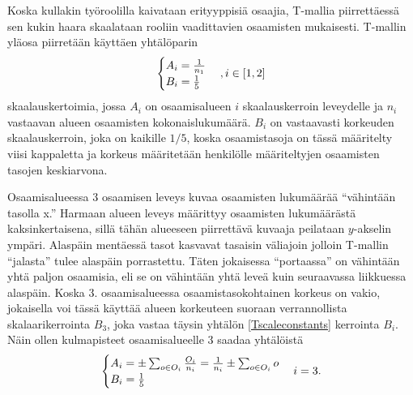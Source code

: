 \documentclass[a4paper,finnish,12pt]{article}
\begin{document}
Koska kullakin työroolilla kaivataan erityyppisiä osaajia, T-mallia piirrettäessä sen kukin haara skaalataan rooliin vaadittavien osaamisten mukaisesti. T-mallin yläosa piirretään käyttäen yhtälöparin %
\begin{equation}
\begin{cases}
A_i = \frac{1}{n_1} \\
B_i = \frac{1}{5} \\
\end{cases} \\ , i \in [1,2]
\label{Tscaleconstants}
\end{equation} skaalauskertoimia, jossa $A_i$ on osaamisalueen $i$ skaalauskerroin leveydelle ja $n_i$ vastaavan alueen osaamisten kokonaislukumäärä. $B_i$ on vastaavasti korkeuden skaalauskerroin, joka on kaikille $1/5$, koska osaamistasoja on tässä määritelty viisi kappaletta ja korkeus määritetään henkilölle määriteltyjen osaamisten tasojen keskiarvona.

Osaamisalueessa 3 osaamisen leveys kuvaa osaamisten lukumäärää ``vähintään tasolla x.'' Harmaan alueen leveys määrittyy osaamisten lukumäärästä kaksinkertaisena, sillä tähän alueeseen piirrettävä kuvaaja peilataan $y$-akselin ympäri. Alaspäin mentäessä tasot kasvavat tasaisin väliajoin jolloin T-mallin ``jalasta'' tulee alaspäin porrastettu. Täten jokaisessa ``portaassa'' on vähintään yhtä paljon osaamisia, eli se on vähintään yhtä leveä kuin seuraavassa liikkuessa alaspäin. Koska 3. osaamisalueessa osaamistasokohtainen korkeus on vakio, jokaisella voi tässä käyttää alueen korkeuteen suoraan verrannollista skalaarikerrointa $B_3$, joka vastaa täysin yhtälön \eqref{Tscaleconstants} kerrointa $B_i$. Näin ollen kulmapisteet osaamisalueelle 3 saadaa yhtälöistä
\begin{equation}
\begin{cases}
A_i = \pm \sum_{o \in O_i} \frac{O_i}{n_i} = \frac{1}{n_i} \pm \sum_{o \in O_i} o \\
B_i = \frac{1}{5}
\end{cases} \\ i = 3.
\label{Tscaleconstants3}
\end{equation} 
\end{document}
